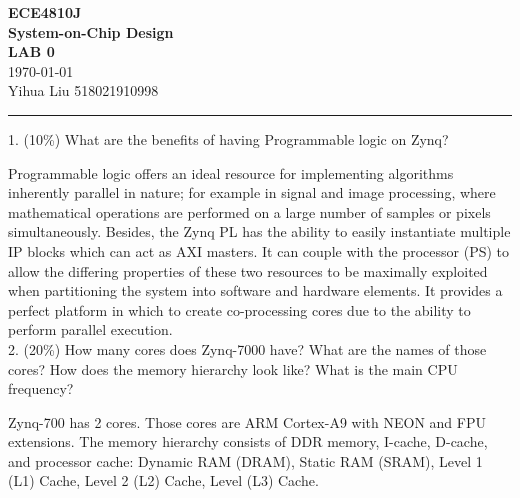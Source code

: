 \documentclass[a4paper]{article}
\begin{document}
\begin{center}
    \huge
    \textbf{ECE4810J\\System-on-Chip Design\\}
    \Large
    \vspace{15pt}
    \uppercase{\textbf{Lab 0}}\\
    \large
    \vspace{5pt}\today\\
    \vspace{5pt}
    Yihua Liu 518021910998
    \vspace{5pt}
    \rule[-5pt]{.97\linewidth}{0.05em}
\end{center}
1. (10\%) What are the benefits of having Programmable logic on Zynq?

Programmable logic offers an ideal resource for implementing algorithms inherently parallel in nature; for example in signal and image processing, where mathematical operations are performed on a large number of samples or pixels simultaneously. Besides, the Zynq PL has the ability to easily instantiate multiple IP blocks which can act as AXI masters.
It can couple with the processor (PS) to allow the differing properties of these two resources to be maximally exploited when partitioning the system into software and hardware elements. It provides a perfect platform in which to create co-processing cores due to the ability to perform parallel execution.\\
2. (20\%) How many cores does Zynq-7000 have? What are the names of those cores? How does the memory hierarchy look like? What is the main CPU frequency?

Zynq-700 has 2 cores. Those cores are ARM Cortex-A9 with NEON and FPU extensions. The memory hierarchy consists of DDR memory, I-cache, D-cache, and processor cache: Dynamic RAM (DRAM), Static RAM (SRAM), Level 1 (L1) Cache, Level 2 (L2) Cache, Level (L3) Cache.
\end{document}
